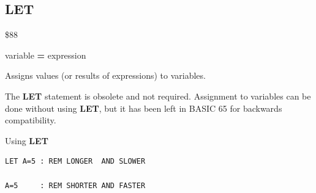 
\newpage
\subsection{LET}
\begin{description}[leftmargin=2cm,style=nextline]
\item [Token:]    \$88

\item [Format:]   [{\bf LET}] variable {\bf=} expression

\item [Usage:]    Assigns values (or results of expressions) to variables.

\item [Remarks:]  The {\bf LET} statement is obsolete and not required. Assignment to variables can be done without using {\bf LET}, but it has been left in BASIC 65 for backwards compatibility.

\item [Examples:] Using {\bf LET}

\begin{tcolorbox}[colback=black,coltext=white]
\verbatimfont{\codefont}
\begin{verbatim}
LET A=5 : REM LONGER  AND SLOWER

A=5     : REM SHORTER AND FASTER
\end{verbatim}
\end{tcolorbox}
\end{description}


\newpage

